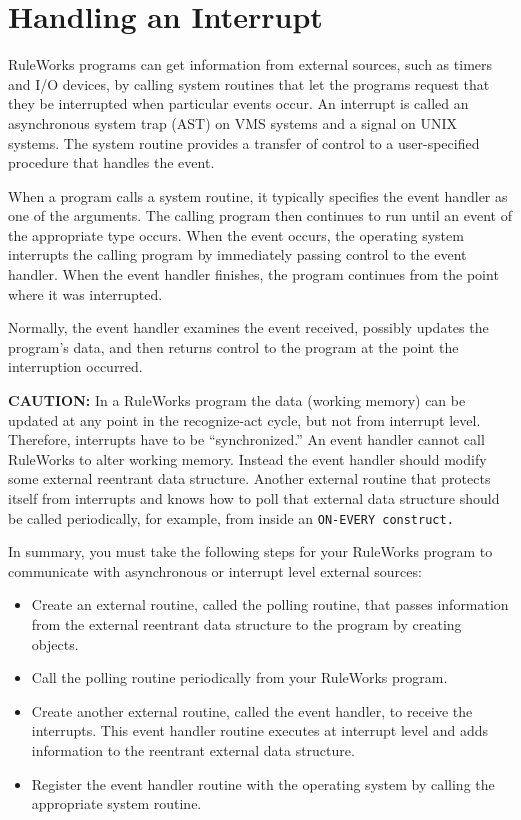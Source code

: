\section{Handling an Interrupt}

RuleWorks programs can get information from external sources, such as
timers and I/O devices, by calling system routines that let the
programs request that they be interrupted when particular events
occur. An interrupt is called an asynchronous system trap (AST) on VMS
systems and a signal on UNIX systems. The system routine provides a
transfer of control to a user-specified procedure that handles the
event.

When a program calls a system routine, it typically specifies the
event handler as one of the arguments. The calling program then
continues to run until an event of the appropriate type occurs. When
the event occurs, the operating system interrupts the calling program
by immediately passing control to the event handler. When the event
handler finishes, the program continues from the point where it was
interrupted.

Normally, the event handler examines the event received, possibly
updates the program's data, and then returns control to the program at
the point the interruption occurred.

\textbf{CAUTION:} In a RuleWorks program the data (working memory) can
be updated at any point in the recognize-act cycle, but not from
interrupt level.  Therefore, interrupts have to be ``synchronized.''
An event handler cannot call RuleWorks to alter working
memory. Instead the event handler should modify some external
reentrant data structure. Another external routine that protects
itself from interrupts and knows how to poll that external data
structure should be called periodically, for example, from inside an
\tt{ON-EVERY} construct.

In summary, you must take the following steps for your RuleWorks
program to communicate with asynchronous or interrupt level external
sources:

\begin{itemize}
\item Create an external routine, called the polling routine, that
  passes information from the external reentrant data structure to the
  program by creating objects.
\item Call the polling routine periodically from your RuleWorks
  program.
\item Create another external routine, called the event handler, to
  receive the interrupts. This event handler routine executes at
  interrupt level and adds information to the reentrant external data
  structure.
\item Register the event handler routine with the operating system by
  calling the appropriate system routine.
\end{itemize}
             
